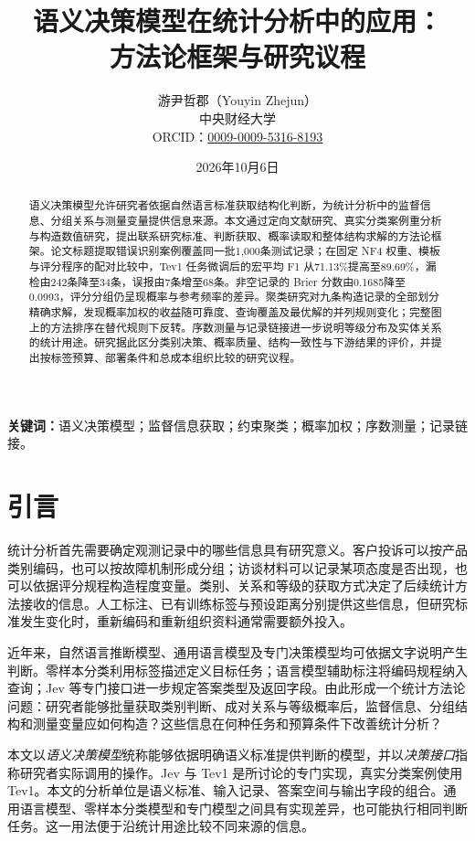 \documentclass[UTF8,a4paper,zihao=-4,fontset=fandol]{ctexart}
\title{\bfseries 语义决策模型在统计分析中的应用：\\方法论框架与研究议程}
\author{游尹哲郡（Youyin Zhejun）\\[0.3em]
\small 中央财经大学\\
\small ORCID：\href{https://orcid.org/0009-0009-5316-8193}{0009-0009-5316-8193}}
\date{2026年10月6日}
\begin{document}
\maketitle
\thispagestyle{plain}
\begin{abstract}
语义决策模型允许研究者依据自然语言标准获取结构化判断，为统计分析中的监督信息、分组关系与测量变量提供信息来源。本文通过定向文献研究、真实分类案例重分析与构造数值研究，提出联系研究标准、判断获取、概率读取和整体结构求解的方法论框架。论文标题提取错误识别案例覆盖同一批1,000条测试记录；在固定 NF4 权重、模板与评分程序的配对比较中，Tev1 任务微调后的宏平均 F1 从71.13\%提高至89.69\%，漏检由242条降至34条，误报由7条增至68条。非空记录的 Brier 分数由0.1685降至0.0993，评分分组仍呈现概率与参考频率的差异。聚类研究对九条构造记录的全部划分精确求解，发现概率加权的收益随可靠度、查询覆盖及最优解的并列规则变化；完整图上的方法排序在替代规则下反转。序数测量与记录链接进一步说明等级分布及实体关系的统计用途。研究据此区分类别决策、概率质量、结构一致性与下游结果的评价，并提出按标签预算、部署条件和总成本组织比较的研究议程。
\end{abstract}
\noindent\textbf{关键词：}语义决策模型；监督信息获取；约束聚类；概率加权；序数测量；记录链接。

\section{引言}\label{sec:intro}

统计分析首先需要确定观测记录中的哪些信息具有研究意义。客户投诉可以按产品类别编码，也可以按故障机制形成分组；访谈材料可以记录某项态度是否出现，也可以依据评分规程构造程度变量。类别、关系和等级的获取方式决定了后续统计方法接收的信息。人工标注、已有训练标签与预设距离分别提供这些信息，但研究标准发生变化时，重新编码和重新组织资料通常需要额外投入。

近年来，自然语言推断模型、通用语言模型及专门决策模型均可依据文字说明产生判断。零样本分类利用标签描述定义目标任务；语言模型辅助标注将编码规程纳入查询；Jev 等专门接口进一步规定答案类型及返回字段\citep{yin2019,tan2024,typesafe-intro}。由此形成一个统计方法论问题：研究者能够批量获取类别判断、成对关系与等级概率后，监督信息、分组结构和测量变量应如何构造？这些信息在何种任务和预算条件下改善统计分析？

本文以\emph{语义决策模型}统称能够依据明确语义标准提供判断的模型，并以\emph{决策接口}指称研究者实际调用的操作。Jev 与 Tev1 是所讨论的专门实现，真实分类案例使用 Tev1。本文的分析单位是语义标准、输入记录、答案空间与输出字段的组合。通用语言模型、零样本分类模型和专门模型之间具有实现差异，也可能执行相同判断任务。这一用法便于沿统计用途比较不同来源的信息。
\end{document}
